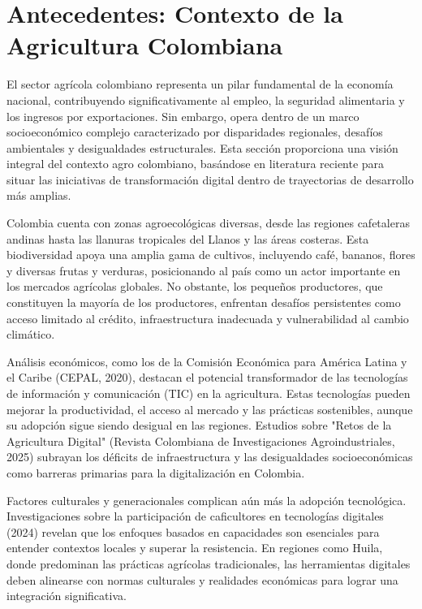 \section{Antecedentes: Contexto de la Agricultura Colombiana}

El sector agrícola colombiano representa un pilar fundamental de la economía nacional, contribuyendo significativamente al empleo, la seguridad alimentaria y los ingresos por exportaciones. Sin embargo, opera dentro de un marco socioeconómico complejo caracterizado por disparidades regionales, desafíos ambientales y desigualdades estructurales. Esta sección proporciona una visión integral del contexto agro colombiano, basándose en literatura reciente para situar las iniciativas de transformación digital dentro de trayectorias de desarrollo más amplias.

Colombia cuenta con zonas agroecológicas diversas, desde las regiones cafetaleras andinas hasta las llanuras tropicales del Llanos y las áreas costeras. Esta biodiversidad apoya una amplia gama de cultivos, incluyendo café, bananos, flores y diversas frutas y verduras, posicionando al país como un actor importante en los mercados agrícolas globales. No obstante, los pequeños productores, que constituyen la mayoría de los productores, enfrentan desafíos persistentes como acceso limitado al crédito, infraestructura inadecuada y vulnerabilidad al cambio climático.

Análisis económicos, como los de la Comisión Económica para América Latina y el Caribe (CEPAL, 2020), destacan el potencial transformador de las tecnologías de información y comunicación (TIC) en la agricultura. Estas tecnologías pueden mejorar la productividad, el acceso al mercado y las prácticas sostenibles, aunque su adopción sigue siendo desigual en las regiones. Estudios sobre "Retos de la Agricultura Digital" (Revista Colombiana de Investigaciones Agroindustriales, 2025) subrayan los déficits de infraestructura y las desigualdades socioeconómicas como barreras primarias para la digitalización en Colombia.

Factores culturales y generacionales complican aún más la adopción tecnológica. Investigaciones sobre la participación de caficultores en tecnologías digitales (2024) revelan que los enfoques basados en capacidades son esenciales para entender contextos locales y superar la resistencia. En regiones como Huila, donde predominan las prácticas agrícolas tradicionales, las herramientas digitales deben alinearse con normas culturales y realidades económicas para lograr una integración significativa.

